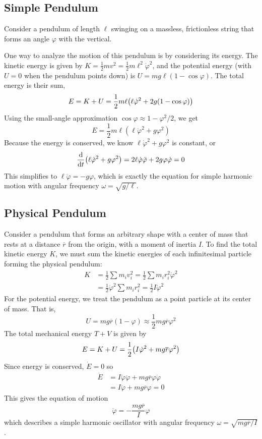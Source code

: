 \subsection*{Simple Pendulum}
Consider a pendulum of length $\ell$ swinging on a massless, frictionless string that forms an angle $\varphi$ with the vertical. 

One way to analyze the motion of this pendulum is by considering its energy. The kinetic energy is given by $K = \frac{1}{2}mv^2 = \frac{1}{2}m\ell^2\dot \varphi^2$, and the potential energy (with $U = 0$ when the pendulum points down) is $U = mg\ell(1 - \cos\varphi)$. The total energy is their sum,
\[ E = K+U = \frac{1}{2}m\ell\pqty{\ell\dot\varphi^2 + 2g(1-\cos\varphi)}\]
Using the small-angle approximation $\cos\varphi \approx 1- \varphi^2/2$, we get
\[ E = \frac{1}{2}m\ell(\ell \dot\varphi^2 + g\varphi^2)\]
Because the energy is conserved, we know $\ell\dot\varphi^2 + g\varphi^2$ is constant, or
\[ \dv{t} (\ell\dot\varphi^2 + g\varphi^2) = 2\ell \dot\varphi\ddot \varphi + 2g\varphi\dot\varphi = 0\]
This simplifies to $\ell\ddot\varphi = -g\varphi$, which is exactly the equation for simple harmonic motion with angular frequency $\omega = \sqrt{g/\ell}$.
\subsection*{Physical Pendulum}
Consider a pendulum that forms an arbitrary shape with a center of mass that rests at a distance $\overline r$ from the origin, with a moment of inertia $I$. To find the total kinetic energy $K$, we must sum the kinetic energies of each infinitesimal particle forming the physical pendulum:
\begin{align*}
    K &= \frac{1}{2}\sum m_iv_i^2 = \frac{1}{2}\sum m_i r_i^2\dot\varphi^2 \\
    &= \frac{1}{2}\dot\varphi^2\sum m_ir_i^2 = \frac{1}{2}I\dot\varphi^2
\end{align*}
For the potential energy, we treat the pendulum as a point particle at its center of mass. That is,
\[ U = mg\overline r(1-\varphi) \approx \frac{1}{2}mg\overline r \varphi^2\]
The total mechanical energy $T+V$ is given by
\[ E = K+U = \frac{1}{2}\pqty{I\dot\varphi^2 + mg\overline r\varphi^2}\]
Since energy is conserved, $\dot E = 0$ so
\begin{align*}
    \dot E &= I\dot\varphi \ddot\varphi + mg\overline r \varphi\dot\varphi \\
    &= I\ddot \varphi + mg\overline r \varphi = 0
\end{align*}
This gives the equation of motion
\[ \ddot\varphi = -\frac{mg\overline r}{I}\varphi \]
which describes a simple harmonic oscillator with angular frequency $\omega = \sqrt{mg\overline r/I}$.
